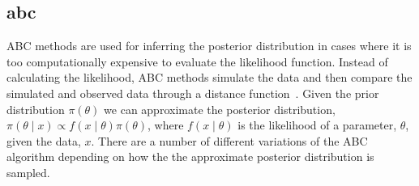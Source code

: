 \subsection{\acrfull{abc}}


ABC methods are used for inferring the posterior distribution in cases where it is too computationally expensive to evaluate the likelihood function. Instead of calculating the likelihood, ABC methods simulate the data and then compare the simulated and observed data through a distance function~\autocite{Toni:2009tr}. Given the prior distribution $\pi(\theta)$ we can approximate the posterior distribution, $\pi(\theta\mid x)\propto f(x\mid\theta)\pi(\theta)$, where $f(x\mid\theta)$ is the likelihood of a parameter, $\theta$, given the data, $x$. There are a number of different variations of the ABC algorithm depending on how the the approximate posterior distribution is sampled. 

